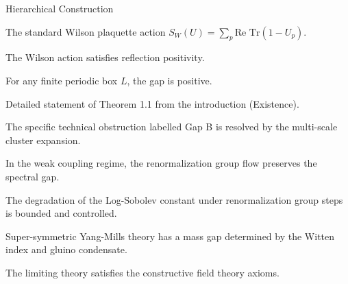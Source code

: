 \begin{subsection}{Hierarchical Construction}
\label{subsec:hierarchical}
\end{subsection}

\begin{definition}
\label{def:wilson_action}
The standard Wilson plaquette action $S_W(U) = \sum_p \text{Re Tr}(1 - U_p)$.
\end{definition}

\begin{theorem}
\label{thm:rp_wilson}
The Wilson action satisfies reflection positivity.
\end{theorem}

\begin{theorem}
\label{thm:finite_volume_gap}
For any finite periodic box $L$, the gap is positive.
\end{theorem}

\begin{theorem}
\label{thm:1.1}
Detailed statement of Theorem 1.1 from the introduction (Existence).
\end{theorem}

\begin{corollary}
\label{cor:gap-b-resolved}
The specific technical obstruction labelled Gap B is resolved by the multi-scale cluster expansion.
\end{corollary}

\begin{theorem}
\label{thm:weak-coupling-gap}
In the weak coupling regime, the renormalization group flow preserves the spectral gap.
\end{theorem}

\begin{theorem}
\label{thm:rg-degradation}
The degradation of the Log-Sobolev constant under renormalization group steps is bounded and controlled.
\end{theorem}

\begin{theorem}
\label{thm:susy-gap-explicit}
Super-symmetric Yang-Mills theory has a mass gap determined by the Witten index and gluino condensate.
\end{theorem}

\begin{theorem}
\label{thm:os-axioms-verified}
The limiting theory satisfies the constructive field theory axioms.
\end{theorem}

